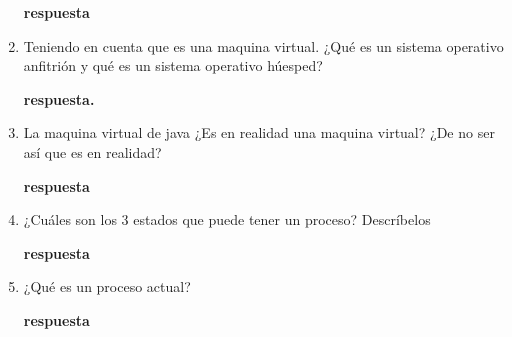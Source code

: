\documentclass[12pt]{article}
\begin{document}
\begin{enumerate}
    \textbf{respuesta}
    \item Teniendo en cuenta que es una maquina virtual. ¿Qué es un sistema operativo anfitrión y qué es un sistema operativo húesped?  
    \vspace{2mm}

    \textbf{respuesta.}
    \item La maquina virtual de java ¿Es en realidad una maquina virtual? ¿De no ser así que es en realidad?
    \vspace{2mm}

    \textbf{respuesta}
    \item ¿Cuáles son los 3 estados que puede tener un proceso? Descríbelos
    \vspace{2mm}

    \textbf{respuesta} 
    \item ¿Qué es un proceso actual?
    \vspace{2mm}
    
    \textbf{respuesta}

\end{enumerate}
\end{document}
